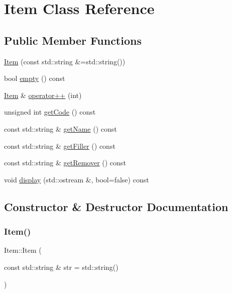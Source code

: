 \hypertarget{classItem}{}\section{Item Class Reference}
\label{classItem}
\subsection*{Public Member Functions}
\begin{DoxyCompactItemize}
\item 
\mbox{\hyperlink{classItem_a878f8ff05023bb47d42bf2c2a98da323}{Item}} (const std\+::string \&=std\+::string())
\item 
bool \mbox{\hyperlink{classItem_a8a1745ce42e5695d5c63c62bd5be7d8e}{empty}} () const
\item 
\mbox{\hyperlink{classItem}{Item}} \& \mbox{\hyperlink{classItem_a818f9273ed8889c8b27cb97d2c292e77}{operator++}} (int)
\item 
unsigned int \mbox{\hyperlink{classItem_a359a6949cfad6cfb7f7d85e132525056}{get\+Code}} () const
\item 
const std\+::string \& \mbox{\hyperlink{classItem_a906722df9ab3f424d32c4106ff64aa15}{get\+Name}} () const
\item 
const std\+::string \& \mbox{\hyperlink{classItem_a67903e1bcdd09d0857295a33b5fbeb6b}{get\+Filler}} () const
\item 
const std\+::string \& \mbox{\hyperlink{classItem_a259c9f359ed2378aae4cbb5ea53bef18}{get\+Remover}} () const
\item 
void \mbox{\hyperlink{classItem_a9433e55e0165564bbbdb77bd01853728}{display}} (std\+::ostream \&, bool=false) const
\end{DoxyCompactItemize}


\subsection{Constructor \& Destructor Documentation}
\mbox{\label{classItem_a878f8ff05023bb47d42bf2c2a98da323}} 
\subsubsection{\texorpdfstring{Item()}{Item()}}
{\footnotesize\ttfamily Item\+::\+Item (\begin{DoxyParamCaption}\item[{const std\+::string \&}]{str = {\ttfamily std\+:\+:string()} }\end{DoxyParamCaption})}

